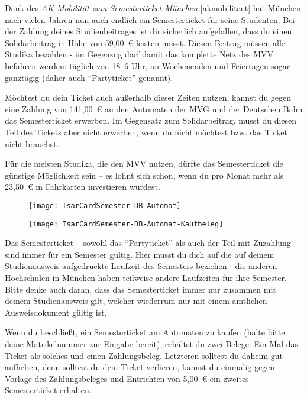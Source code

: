 Dank des \emph{AK Mobilität zum Semesterticket München} \ref{akmobilitaet} hat
München nach vielen Jahren nun auch endlich ein Semesterticket für seine
Studenten. Bei der Zahlung deines Studienbeitrages ist dir sicherlich
aufgefallen, dass du einen Solidarbeitrag in Höhe von 59,00~€ leisten musst.
Diesen Beitrag müssen alle Studika bezahlen - im Gegenzug darf damit das
komplette Netz des MVV befahren werden: täglich von 18--6 Uhr, an Wochenenden
und Feiertagen sogar ganztägig (daher auch ``Partyticket'' genannt).


Möchtest du dein Ticket auch außerhalb dieser Zeiten nutzen, kannst du gegen
eine Zahlung von 141,00~€ an den Automaten der MVG und der
Deutschen Bahn das Semesterticket erwerben. Im Gegensatz zum Solidarbeitrag,
musst du diesen Teil des Tickets aber nicht erwerben, wenn du nicht möchtest
bzw. das Ticket nicht brauchst.

Für die meisten Studika, die den MVV nutzen, dürfte das Semesterticket die
günstige Möglichkeit sein -- es lohnt sich schon, wenn du pro Monat mehr als
23,50~€ in Fahrkarten investieren würdest.

\begin{figure}[ht]
\centering
	\begin{minipage}[b]{0.45\linewidth}
		\texttt{[image: IsarCardSemester-DB-Automat]}
		\label{fig:isarcardsemesterdb}
	\end{minipage}
	\quad
	\begin{minipage}[b]{0.45\linewidth}
		\texttt{[image: IsarCardSemester-DB-Automat-Kaufbeleg]}
		\label{fig:isarcardsemesterbelegdb}
	\end{minipage}
\end{figure}

Das Semesterticket -- sowohl das ``Partyticket'' als auch der Teil mit
Zuzahlung -- sind immer für ein Semester gültig. Hier musst du dich auf die auf
deinem Studienausweis aufgedruckte Laufzeit des Semesters beziehen - die
anderen Hochschulen in München haben teilweise andere Laufzeiten für ihre
Semester. Bitte denke auch daran, dass das Semesterticket immer nur zusammen
mit deinem Studienausweis gilt, welcher wiederrum nur mit einem amtlichen
Ausweisdokument gültig ist.

Wenn du beschließt, ein Semesterticket am Automaten zu kaufen (halte bitte deine
Matrikelnummer zur Eingabe bereit), erhältst du zwei Belege: Ein Mal das Ticket
als solches und einen Zahlungsbeleg. Letzteren solltest du daheim gut aufheben,
denn solltest du dein Ticket verlieren, kannst du einmalig gegen Vorlage des
Zahlungsbeleges und Entrichten von 5,00~€ ein zweites Semesterticket erhalten.

